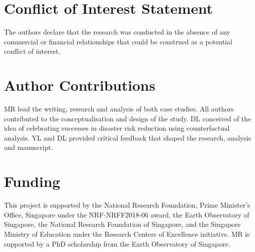 \documentclass[utf8]{frontiersSCNS} %
\begin{document}

\section*{Conflict of Interest Statement}

The authors declare that the research was conducted in the absence of any commercial or financial relationships that could be construed as a potential conflict of interest.


\section*{Author Contributions}

MR lead the writing, research and analysis of both case studies. All authors contributed to the conceptualisation and design of the study. DL conceived of the idea of celebrating successes in disaster risk reduction using counterfactual analysis. YL and DL provided critical feedback that shaped the research, analysis and manuscript.


\section*{Funding}
This project is supported by the National Research Foundation, Prime Minister’s Office, Singapore under the NRF-NRFF2018-06 award, the Earth Observatory of Singapore, the National Research Foundation of Singapore, and the Singapore Ministry of Education under the Research Centers of Excellence initiative. MR is supported by a PhD scholarship from the Earth Observatory of Singapore.
\end{document}
